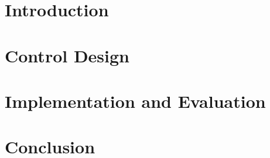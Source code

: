 \documentclass[a4paper]{article}
\begin{document}
\begin{center}
	
	
	
	
	
	
\end{center}

\section{Introduction}

\section{Control Design}

\section{Implementation and Evaluation}

\section{Conclusion}
\end{document}
